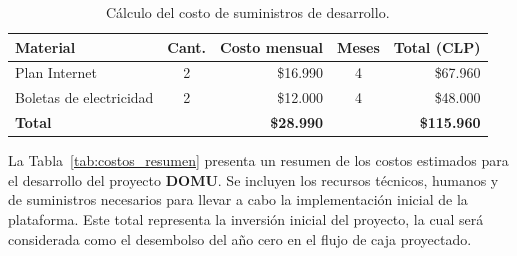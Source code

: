 {\begin{table}[H]

    \centering
    
    \caption{Cálculo del costo de suministros de desarrollo.}
    
    \label{tab:costos_suministros}
    
    \begin{tabular}{|l|c|r|c|r|}
    
    \hline
    \textbf{Material} & \textbf{Cant.} & \textbf{Costo mensual} & \textbf{Meses} & \textbf{Total (CLP)}\\
    \hline
    
    Plan Internet & 2 & \$16.990 & 4 & \$67.960\\
    Boletas de electricidad & 2 & \$12.000 & 4 & \$48.000\\
    \hline
    \textbf{Total} & & \textbf{\$28.990} & & \textbf{\$115.960}\\
    \hline
    
    \end{tabular}
\end{table}



La Tabla~\ref{tab:costos_resumen} presenta un resumen de los costos estimados para el desarrollo del proyecto \textbf{DOMU}. Se incluyen los recursos técnicos, humanos y de suministros necesarios para llevar a cabo la implementación inicial de la plataforma. Este total representa la inversión inicial del proyecto, la cual será considerada como el desembolso del año cero en el flujo de caja proyectado.


\begin{table}[H]

    \centering
    
    \caption{Resumen de Costos de Desarrollo.}
    
    \label{tab:costos_resumen}
    

\end{table}}

